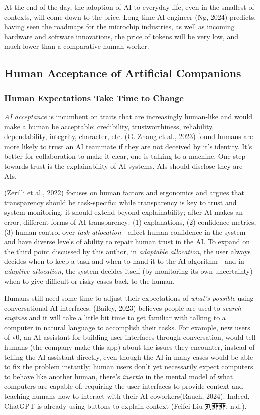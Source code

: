 \documentclass[
  letterpaper,
  DIV=11,
  numbers=noendperiod]{scrartcl}
\begin{document}
At the end of the day, the adoption of AI to everyday life, even in the
smallest of contexts, will come down to the price. Long-time AI-engineer
(Ng, 2024) predicts, having seen the roadmaps for the microchip
industries, as well as incoming hardware and software innovations, the
price of tokens will be very low, and much lower than a comparative
human worker.

\subsection{Human Acceptance of Artificial
Companions}\label{human-acceptance-of-artificial-companions}

\subsubsection{Human Expectations Take Time to
Change}\label{human-expectations-take-time-to-change}

\emph{AI acceptance} is incumbent on traits that are increasingly
human-like and would make a human be acceptable: credibility,
trustworthiness, reliability, dependability, integrity, character, etc.
(G. Zhang et al., 2023) found humans are more likely to trust an AI
teammate if they are not deceived by it's identity. It's better for
collaboration to make it clear, one is talking to a machine. One step
towards trust is the explainability of AI-systems. AIs should disclose
they are AIs.

(Zerilli et al., 2022) focuses on human factors and ergonomics and
argues that transparency should be task-specific: while transparency is
key to trust and system monitoring, it should extend beyond
explainability; after AI makes an error, different forms of AI
transparency: (1) explanations, (2) confidence metrics, (3) human
control over \emph{task allocation} - affect human confidence in the
system and have diverse levels of ability to repair human trust in the
AI. To expand on the third point discussed by this author, in
\emph{adaptable allocation}, the user always decides when to keep a task
and when to hand it to the AI algorithm - and in \emph{adaptive
allocation}, the system decides itself (by monitoring its own
uncertainty) when to give difficult or risky cases back to the human.

Humans still need some time to adjust their expectations of \emph{what's
possible} using conversational AI interfaces. (Bailey, 2023) believes
people are used to \emph{search engines} and it will take a little bit
time to get familiar with talking to a computer in natural language to
accomplish their tasks. For example, new users of v0, an AI assistant
for building user interfaces through conversation, would tell humans
(the company make this app) about the issues they encounter, instead of
telling the AI assistant directly, even though the AI in many cases
would be able to fix the problem instantly; human users don't yet
necessarily expect computers to behave like another human, there's
\emph{inertia} in the mental model of what computers are capable of,
requiring the user interfaces to provide context and teaching humans how
to interact with their AI coworkers(Rauch, 2024). Indeed, ChatGPT is
already using buttons to explain context (Feifei Liu 刘菲菲, n.d.).
\end{document}
